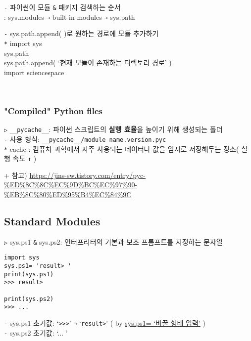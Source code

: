 \documentclass[11pt,a4paper]{article}
\begin{document}
\texttt{-} 파이썬이 모듈 \verb|&| 패키지 검색하는 순서\\
: sys.modules \texttt{→} built-in modules \texttt{→} sys.path\\

\begin{spacing}{1.5}
\texttt{-} sys.path.append( )로 원하는 경로에 모듈 추가하기\\
\texttt{*} import sys\\
\hspace*{2em}sys.path\\
\hspace*{2em}sys.path.append( `현재 모듈이 존재하는 디렉토리 경로' )\\
\hspace*{2em}import sciencespace
\end{spacing}\\

\subsubsection{\Large\textbf{"Compiled" Python files}}
\begin{spacing}{1.5}
\texttt{▷} \verb|__pycache__|: 파이썬 스크립트의 \textbf{실행 효율}을 높이기 위해 생성되는 폴더\\
\texttt{-} 사용 형식: \verb|__pycache__/module name.version.pyc|\\
\hspace*{2em}\verb|*| cache : 컴퓨처 과학에서 자주 사용되는 데이터나 값을 임시로 저장해두는 장소( 실행 속도 \texttt{↑} )
\end{spacing}
+ 참고)  \url{https://jins-sw.tistory.com/entry/pyc-%ED%8C%8C%EC%9D%BC%EC%97%90-%EB%8C%80%ED%95%B4%EC%84%9C}\\

\subsection{\Large\textbf{Standard Modules}}
\texttt{▷} sys.ps1 \verb|&| sys.ps2: 인터프리터의 기본과 보조 프롬프트를 지정하는 문자열
\begin{spacing}{1.5}
\begin{lstlisting}[label={list:first}]
import sys
sys.ps1= 'result> '
print(sys.ps1)
>>> result>

print(sys.ps2)
>>> ...
\end{lstlisting}
\texttt{-} sys.ps1 초기값: `\verb|>>>|' \texttt{→} `\verb|result>|' ( by \underline{sys.ps1= `바꿀 형태 입력'} )\\
\texttt{-} sys.ps2 초기값: `... ' \\
\end{spacing}
\end{document}
